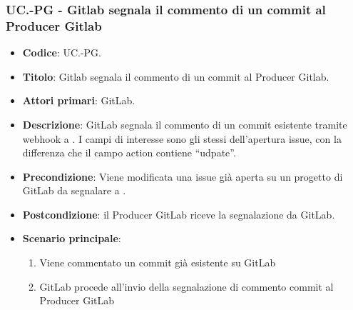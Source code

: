 \subsubsection{UC\theuccount.\thesubuccount-PG - Gitlab segnala il commento di un commit al Producer Gitlab}
\begin{itemize}
    \item \textbf{Codice}: UC\theuccount.\thesubuccount-PG.
    \item \textbf{Titolo}: Gitlab segnala il commento di un commit al Producer Gitlab.
    \item \textbf{Attori primari}: GitLab.
    \item \textbf{Descrizione}: GitLab segnala il commento di un commit esistente tramite webhook a \progetto.
    I campi di interesse sono gli stessi dell'apertura issue, con la differenza che il campo action contiene ``udpate''.
    \item \textbf{Precondizione}: Viene modificata una issue già aperta su un
    progetto di GitLab da segnalare a \progetto.
    \item \textbf{Postcondizione}: il Producer GitLab riceve la segnalazione da GitLab.
    \item \textbf{Scenario principale}: 
    \begin{enumerate}
        \item Viene commentato un commit già esistente su GitLab
        \item GitLab procede all'invio della segnalazione di commento commit al Producer GitLab
    \end{enumerate}
    
\end{itemize}


